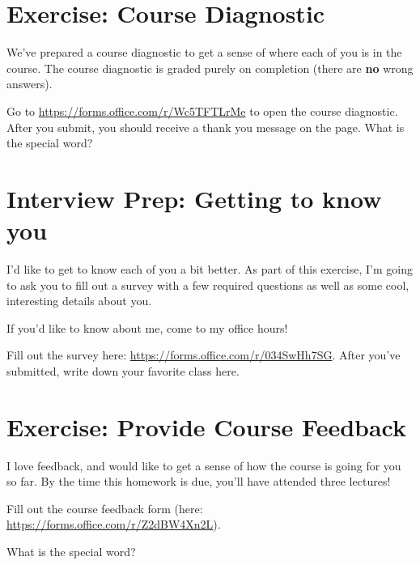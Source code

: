 \documentclass [12pt]{article}
\begin{document}
 
\section {Exercise: Course Diagnostic} 
 We've prepared a course diagnostic to get a sense of where each of you is in the course. The course diagnostic is graded purely on completion (there are \textbf{no} wrong answers). 

Go to \href{https://forms.office.com/r/Wc5TFTLrMe}{https://forms.office.com/r/Wc5TFTLrMe} to open the course diagnostic. After you submit, you should receive a thank you message on the page. What is the special word?


\pagebreak
\section{Interview Prep: Getting to know you}
 I'd like to get to know each of you a bit better. As part of this exercise, I'm going to ask you to fill out a survey with a few required questions as well as some cool, interesting details about you. 

If you'd like to know about me, come to my office hours!

Fill out the survey here: \href{https://forms.office.com/r/034SwHh7SG}{https://forms.office.com/r/034SwHh7SG}. After you've submitted, write down your favorite class here.


\section{Exercise: Provide Course Feedback}
 I love feedback, and would like to get a sense of how the course is going for you so far. By the time this homework is due, you'll have attended three lectures!

Fill out the course feedback form (here: \href{https://forms.office.com/r/Z2dBW4Xn2L}{https://forms.office.com/r/Z2dBW4Xn2L}).

What is the special word?
\end{document}
